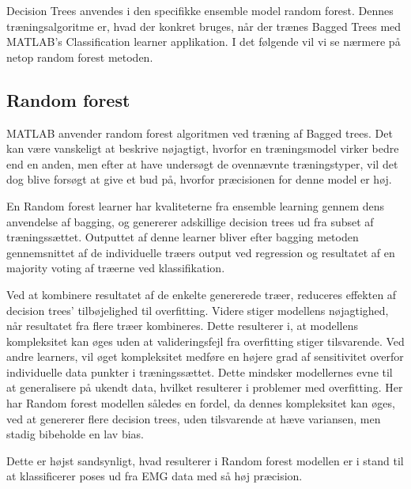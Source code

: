 Decision Trees anvendes i den specifikke ensemble model random forest. Dennes træningsalgoritme er, hvad der konkret bruges, når der trænes Bagged Trees med MATLAB’s Classification learner applikation. I det følgende vil vi se nærmere på netop random forest metoden.

\subsection{Random forest}
MATLAB anvender random forest algoritmen ved træning af Bagged trees. Det kan være vanskeligt at beskrive nøjagtigt, hvorfor en træningsmodel virker bedre end en anden, men efter at have undersøgt de ovennævnte træningstyper, vil det dog blive forsøgt at give et bud på, hvorfor præcisionen for denne model er høj.

En Random forest learner har kvaliteterne fra ensemble learning gennem dens anvendelse af bagging, og genererer adskillige decision trees ud fra subset af træningssættet. Outputtet af denne learner bliver efter bagging metoden gennemsnittet af de individuelle træers output ved regression og resultatet af en majority voting af træerne ved klassifikation. 


Ved at kombinere resultatet af de enkelte genererede træer, reduceres effekten af decision trees' tilbøjelighed til overfitting. Videre stiger modellens nøjagtighed, når resultatet fra flere træer kombineres. Dette resulterer i, at modellens kompleksitet kan øges uden at valideringsfejl fra overfitting stiger tilsvarende. 
Ved andre learners, vil øget kompleksitet medføre en højere grad af sensitivitet overfor individuelle data punkter i træningssættet. Dette mindsker modellernes evne til at generalisere på ukendt data, hvilket resulterer i problemer med overfitting. Her har Random forest modellen således en fordel, da dennes kompleksitet kan øges, ved at genererer flere decision trees, uden tilsvarende at hæve variansen, men stadig bibeholde en lav bias. 

Dette er højst sandsynligt, hvad resulterer i Random forest modellen er i stand til at klassificerer poses ud fra EMG data med så høj præcision.   


